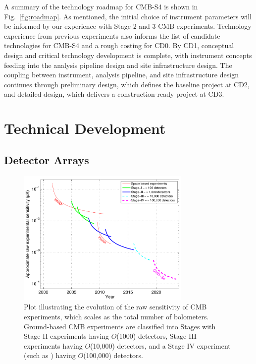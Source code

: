 A summary of the technology roadmap for CMB-S4 is shown in Fig.~\ref{fig:roadmap}.  As mentioned, the initial choice of instrument parameters will be informed by our experience with Stage 2 and 3 CMB experiments. Technology experience from previous experiments also informs the list of candidate technologies for CMB-S4 and a rough costing for CD0. By CD1, conceptual design and critical technology development is complete, with instrument concepts feeding into the analysis pipeline design and site infrastructure design. The coupling between instrument, analysis pipeline, and site infrastructure design continues through preliminary design, which defines the baseline project at CD2, and detailed design, which delivers a construction-ready project at CD3.

\section{Technical Development}

\subsection{Detector Arrays}

\begin{figure}[t]
\centering \includegraphics[width=0.75\textwidth]{Intro/expt_progress.pdf}
\caption{Plot illustrating the evolution of the raw sensitivity of CMB
  experiments, which scales as the total number of
  bolometers. Ground-based CMB experiments are classified into Stages
  with Stage II experiments having $O$(1000) detectors, Stage III
  experiments having $O$(10,000) detectors, and a Stage IV experiment
  (such as \cmbexp) having $O$(100,000) detectors.}
\label{fig:expt_progress}
\end{figure}

